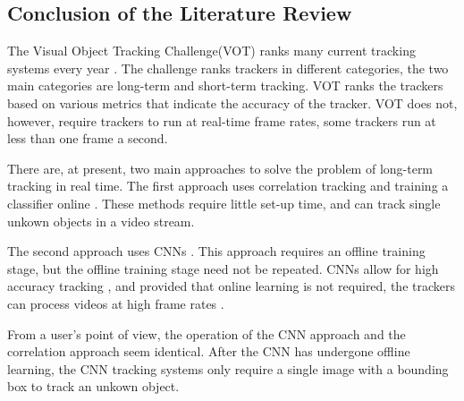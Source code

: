   \subsection{Conclusion of the Literature Review}
    The Visual Object Tracking Challenge(VOT) ranks many current tracking systems every year \cite{VOT2017, Kristan2020a}.
    The challenge ranks trackers in different categories, the two main categories are long-term and short-term tracking.
    VOT ranks the trackers based on various metrics that indicate the accuracy of the tracker. 
    VOT does not, however, require trackers to run at real-time frame rates, some trackers run at less than one frame a second.

    There are, at present, two main approaches to solve the problem of long-term tracking in real time.
    The first approach uses correlation tracking and training a classifier online \cite{Ma2015Correlation, Enriques2014, Kalal2011}.
    These methods require little set-up time, and can track single unkown objects in a video stream.

    The second approach uses CNNs \cite{bertinetto2016}.
    This approach requires an offline training stage, but the offline training stage need not be repeated.
    CNNs allow for high accuracy tracking \cite{CNNTracking, bertinetto2016}, and provided that online learning is not required, the trackers can process videos at high frame rates \cite{Kristan2020a}.

    From a user's point of view, the operation of the CNN approach and the correlation approach seem identical.
    After the CNN has undergone offline learning, the CNN tracking systems only require a single image with a bounding box to track an unkown object.
